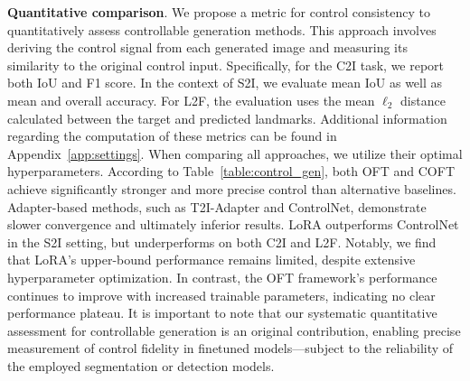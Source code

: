 {\textbf{Quantitative comparison}. We propose a metric for control consistency to quantitatively assess controllable generation methods. This approach involves deriving the control signal from each generated image and measuring its similarity to the original control input. Specifically, for the C2I task, we report both IoU and F1 score. In the context of S2I, we evaluate mean IoU as well as mean and overall accuracy. For L2F, the evaluation uses the mean $\ell_2$ distance calculated between the target and predicted landmarks. Additional information regarding the computation of these metrics can be found in Appendix~\ref{app:settings}. When comparing all approaches, we utilize their optimal hyperparameters. According to Table~\ref{table:control_gen}, both OFT and COFT achieve significantly stronger and more precise control than alternative baselines. Adapter-based methods, such as T2I-Adapter and ControlNet, demonstrate slower convergence and ultimately inferior results. LoRA outperforms ControlNet in the S2I setting, but underperforms on both C2I and L2F. Notably, we find that LoRA's upper-bound performance remains limited, despite extensive hyperparameter optimization. In contrast, the OFT framework's performance continues to improve with increased trainable parameters, indicating no clear performance plateau. It is important to note that our systematic quantitative assessment for controllable generation is an original contribution, enabling precise measurement of control fidelity in finetuned models—subject to the reliability of the employed segmentation or detection models.

}
